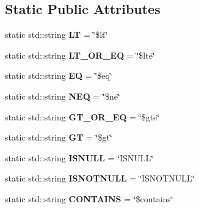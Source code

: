 \subsection*{Static Public Attributes}
\begin{DoxyCompactItemize}
\item 
\mbox{\label{class_droi_condition_afc18fdb11a55016619948b254339cec4}} 
static std\+::string {\bfseries LT} = \char`\"{}\$lt\char`\"{}
\item 
\mbox{\label{class_droi_condition_a30d880259e6c93912fc4e32b770f5769}} 
static std\+::string {\bfseries L\+T\+\_\+\+O\+R\+\_\+\+EQ} = \char`\"{}\$lte\char`\"{}
\item 
\mbox{\label{class_droi_condition_a45a2b476e26b6e20cf39631f760bac32}} 
static std\+::string {\bfseries EQ} = \char`\"{}\$eq\char`\"{}
\item 
\mbox{\label{class_droi_condition_a5497f39da48f8d2e18a5a597fcae3960}} 
static std\+::string {\bfseries N\+EQ} = \char`\"{}\$ne\char`\"{}
\item 
\mbox{\label{class_droi_condition_a5ed3b13122d6ecf8a218a45e7cce803c}} 
static std\+::string {\bfseries G\+T\+\_\+\+O\+R\+\_\+\+EQ} = \char`\"{}\$gte\char`\"{}
\item 
\mbox{\label{class_droi_condition_a4fc371b8fb560d4d526373d8163978e2}} 
static std\+::string {\bfseries GT} = \char`\"{}\$gt\char`\"{}
\item 
\mbox{\label{class_droi_condition_a2f5e20a49385aadccf3aa486b33eefab}} 
static std\+::string {\bfseries I\+S\+N\+U\+LL} = \char`\"{}I\+S\+N\+U\+LL\char`\"{}
\item 
\mbox{\label{class_droi_condition_ab8b3bb51bc52e07c74e7e9109db0efe5}} 
static std\+::string {\bfseries I\+S\+N\+O\+T\+N\+U\+LL} = \char`\"{}I\+S\+N\+O\+T\+N\+U\+LL\char`\"{}
\item 
\mbox{\label{class_droi_condition_a1dc20f50e2f888386200aeebd4b8ba8e}} 
static std\+::string {\bfseries C\+O\+N\+T\+A\+I\+NS} = \char`\"{}\$contains\char`\"{}

\end{DoxyCompactItemize}
